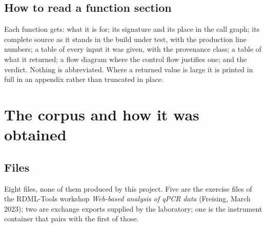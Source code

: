 \documentclass[10pt,a4paper,twoside]{report}
\begin{document}
\section{How to read a function section}
Each function gets: what it is for; its signature and its place in the call graph; its complete
source as it stands in the build under test, with the production line numbers; a table of every
input it was given, with the provenance class; a table of what it returned; a flow diagram where
the control flow justifies one; and the verdict. Nothing is abbreviated. Where a returned value is
large it is printed in full in an appendix rather than truncated in place.

\chapter{The corpus and how it was obtained}\label{ch:corpus}

\section{Files}
Eight files, none of them produced by this project. Five are the exercise files of the RDML-Tools
workshop \emph{Web-based analysis of qPCR data} (Freising, March 2023); two are exchange exports
supplied by the laboratory; one is the instrument container that pairs with the first of those.
\end{document}
